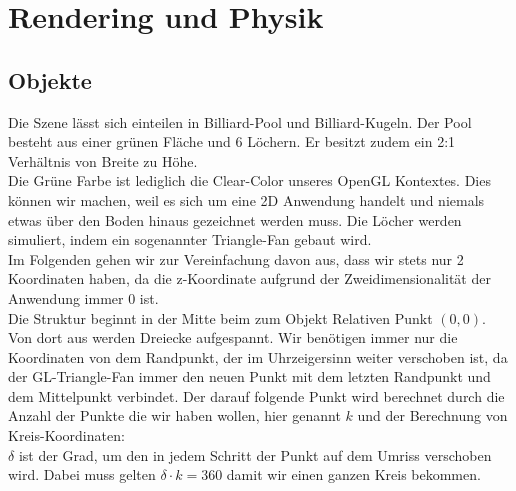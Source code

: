 \section{Rendering und Physik}

\subsection{Objekte}
	Die Szene lässt sich einteilen in Billiard-Pool und Billiard-Kugeln.
	Der Pool besteht aus einer grünen Fläche und 6 Löchern.
	Er besitzt zudem ein 2:1 Verhältnis von Breite zu Höhe. \\
	
	Die Grüne Farbe ist lediglich die Clear-Color unseres OpenGL Kontextes. 
	Dies können wir machen, weil es sich um eine 2D Anwendung handelt und niemals etwas über den Boden hinaus gezeichnet werden muss. 
	Die Löcher werden simuliert, indem ein sogenannter Triangle-Fan gebaut wird.\\
	
	Im Folgenden gehen wir zur Vereinfachung davon aus, dass wir stets nur 2 Koordinaten haben, da die z-Koordinate aufgrund der Zweidimensionalität der Anwendung immer 0 ist. \\
	
	Die Struktur beginnt in der Mitte beim zum Objekt Relativen Punkt $(0,0)$.
	Von dort aus werden Dreiecke aufgespannt. 
	Wir benötigen immer nur die  Koordinaten von dem Randpunkt, der im Uhrzeigersinn weiter verschoben ist, da der GL-Triangle-Fan immer den neuen Punkt mit dem letzten Randpunkt und dem Mittelpunkt verbindet. 
	Der darauf folgende Punkt wird berechnet durch die Anzahl der Punkte die wir haben wollen, hier genannt $k$ und der Berechnung von Kreis-Koordinaten: \\
	
	$\delta$ ist der Grad, um den in jedem Schritt der Punkt auf dem Umriss verschoben wird. 
	Dabei muss gelten $\delta \cdot k = 360$ damit wir einen ganzen Kreis bekommen.\\
	
